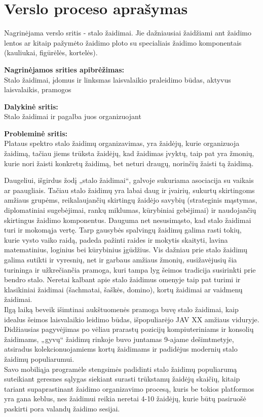 \documentclass{VUMIFPSkursinis}
\begin{document}
\section{Verslo proceso aprašymas}
Nagrinėjama verslo sritis - stalo žaidimai. Jie dažniausiai žaidžiami ant žaidimo 
lentos ar kitaip pažymėto žaidimo ploto su specialiais žaidimo komponentais 
(kauliukai, figūrėlės, kortelės).

\textbf{Nagrinėjamos srities apibrėžimas:}\\
Stalo žaidimai, įdomus ir linksmas laisvalaikio praleidimo būdas, aktyvus 
laisvalaikis, pramogos

\textbf{Dalykinė sritis:}\\
Stalo žaidimai ir pagalba juos organizuojant

\textbf{Probleminė sritis:}\\
Plataus spektro stalo žaidimų organizavimas, yra žaidėjų, kurie organizuoja 
žaidimą, tačiau jiems trūksta žaidėjų, kad žaidimas įvyktų, taip pat yra žmonių, 
kurie nori žaisti konkretų žaidimą, bet neturi draugų, norinčių žaisti tą žaidimą.

Daugeliui, išgirdus žodį „stalo žaidimai“, galvoje sukuriama asociacija 
su vaikais ar paaugliais. Tačiau stalo žaidimų yra labai daug ir įvairių, 
sukurtų skirtingoms amžiaus grupėms, reikalaujančių skirtingų žaidėjo savybių 
(strateginis mąstymas, diplomatiniai sugebėjimai, rankų miklumas, kūrybiniai 
gebėjimai) ir naudojančių skirtingus žaidimo komponentus. Dauguma net nesusimąsto, 
kad stalo žaidimai turi ir mokomąja vertę. Tarp gausybės spalvingų žaidimų galima 
rasti tokių, kurie vysto vaiko raidą, padeda pažinti raides ir mokytis skaityti, 
lavina matematinius, loginius bei kūrybinius įgūdžius. Vis dažniau prie stalo 
žaidimų galima sutikti ir vyresnių, net ir garbaus amžiaus žmonių, susižavėjusių 
šia turininga ir užkrečiančia pramoga, kuri tampa lyg šeimos tradicija susirinkti 
prie bendro stalo. Neretai kalbant apie stalo žaidimus omenyje taip pat turimi ir 
klasikiniai žaidimai (šachmatai, šaškės, domino), kortų žaidimai ar vaidmenų žaidimai.\\
Ilgą laiką beveik išimtinai aukštuomenės pramoga buvę stalo žaidimai, kaip idealus 
šeimos laisvalaikio leidimo būdas, išpopuliarėjo JAV XX amžiaus viduryje. 
Didžiausias pagyvėjimas po vėliau prarastų pozicijų kompiuteriniams ir konsolių 
žaidimams, „gyvų“ žaidimų rinkoje buvo juntamas 9-ajame dešimtmetyje, atsiradus 
kolekcionuojamiems kortų žaidimams ir padidėjus modernių stalo žaidimų populiarumui.\\
Savo mobiliąja programėle stengsimės padidinti stalo žaidimų populiarumą suteikiant 
geresnes sąlygas siekiant surasti trūkstamų žaidėjų skaičių, kitaip tariant 
supaprastinant žaidimo organizavimo procesą, kuris be tokios platformos yra gana 
keblus, nes žaidimui reikia neretai 4-10 žaidėjų, kurie būtų pasiruošė paskirti 
pora valandų žaidimo sesijai.
\end{document}
